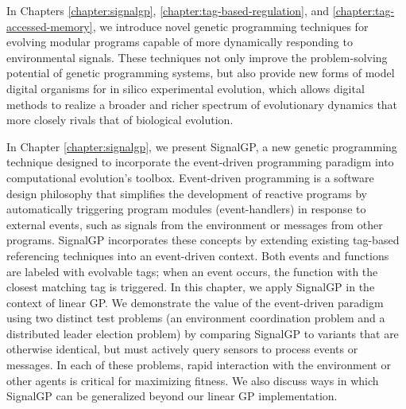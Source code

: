 In Chapters \ref{chapter:signalgp}, \ref{chapter:tag-based-regulation}, and \ref{chapter:tag-accessed-memory}, we introduce novel genetic programming techniques for evolving modular programs capable of more dynamically responding to environmental signals. 
These techniques not only improve the problem-solving potential of genetic programming systems, but also provide new forms of model digital organisms for in silico experimental evolution, which allows digital methods to realize a broader and richer spectrum of evolutionary dynamics that more closely rivals that of biological evolution.

In Chapter \ref{chapter:signalgp}, we present SignalGP, a new genetic programming technique designed to incorporate the event-driven programming paradigm into computational evolution's toolbox. 
Event-driven programming is a software design philosophy that simplifies the development of reactive programs by automatically triggering program modules (event-handlers) in response to external events, such as signals from the environment or messages from other programs. 
SignalGP incorporates these concepts by extending existing tag-based referencing techniques into an event-driven context. 
Both events and functions are labeled with evolvable tags; when an event occurs, the function with the closest matching tag is triggered. 
In this chapter, we apply SignalGP in the context of linear GP. 
We demonstrate the value of the event-driven paradigm using two distinct test problems (an environment coordination problem and a distributed leader election problem) by comparing SignalGP to variants that are otherwise identical, but must actively query sensors to process events or messages. 
In each of these problems, rapid interaction with the environment or other agents is critical for maximizing fitness. 
We also discuss ways in which SignalGP can be generalized beyond our linear GP implementation.

